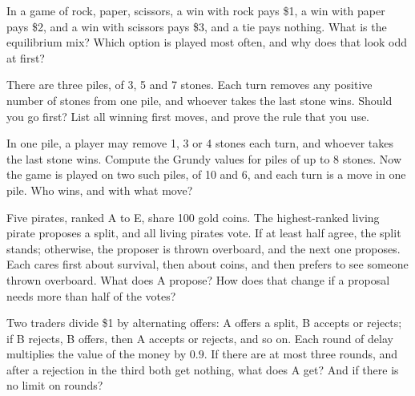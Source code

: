\begin{question}\label{iq:iv1:games:5}
In a game of rock, paper, scissors, a win with rock pays \$1, a win with paper pays \$2, and a win with scissors pays \$3, and a tie pays nothing. What is the equilibrium mix? Which option is played most often, and why does that look odd at first?
\end{question}

\begin{question}\label{iq:iv1:games:6}
There are three piles, of 3, 5 and 7 stones. Each turn removes any positive number of stones from one pile, and whoever takes the last stone wins. Should you go first? List all winning first moves, and prove the rule that you use.
\end{question}

\begin{question}\label{iq:iv1:games:7}
In one pile, a player may remove 1, 3 or 4 stones each turn, and whoever takes the last stone wins. Compute the Grundy values for piles of up to 8 stones. Now the game is played on two such piles, of 10 and 6, and each turn is a move in one pile. Who wins, and with what move?
\end{question}

\begin{question}\label{iq:iv1:games:8}
Five pirates, ranked A to E, share 100 gold coins. The highest-ranked living pirate proposes a split, and all living pirates vote. If at least half agree, the split stands; otherwise, the proposer is thrown overboard, and the next one proposes. Each cares first about survival, then about coins, and then prefers to see someone thrown overboard. What does A propose? How does that change if a proposal needs more than half of the votes?
\end{question}

\begin{question}\label{iq:iv1:games:9}
Two traders divide \$1 by alternating offers: A offers a split, B accepts or rejects; if B rejects, B offers, then A accepts or rejects, and so on. Each round of delay multiplies the value of the money by $0.9$. If there are at most three rounds, and after a rejection in the third both get nothing, what does A get? And if there is no limit on rounds?
\end{question}

